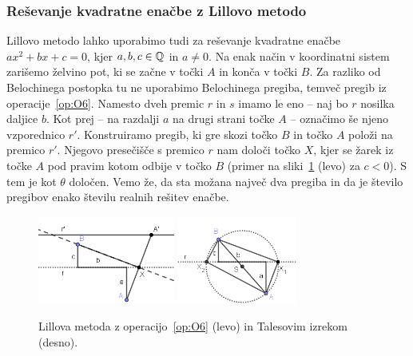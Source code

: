 
\subsubsection{Reševanje kvadratne enačbe z Lillovo metodo}
\label{podpodl:kvadr_en_lill}

Lillovo metodo lahko uporabimo tudi za reševanje kvadratne enačbe $a x^2 + b x + c = 0$, kjer $a, b, c \in \mathbb Q$ in $a \neq 0$. Na enak način v koordinatni sistem zarišemo želvino pot, ki se začne v točki $A$ in konča v točki $B$. Za razliko od Belochinega postopka tu ne uporabimo Belochinega pregiba, temveč pregib iz operacije~\ref{op:O6}. Namesto dveh premic $r$ in $s$ imamo le eno -- naj bo $r$ nosilka daljice $b$. Kot prej -- na razdalji $a$ na drugi strani točke $A$ -- označimo še njeno vzporednico $r'$. Konstruiramo pregib, ki gre skozi točko $B$ in točko $A$ položi na premico $r'$. Njegovo presečišče s premico $r$ nam določi točko $X$, kjer se žarek iz točke $A$ pod pravim kotom odbije v točko $B$ (primer na sliki~\ref{fig:kv_en_lill} (levo) za $c < 0$). S tem je kot $\theta$ določen. Vemo že, da sta možana največ dva pregiba in da je število pregibov enako številu realnih rešitev enačbe.

\begin{figure}[h]
    \centering
    \includegraphics[width=0.4\textwidth]{images/kvadratna_enacba/kvadratna_enacba_lillova_metoda.png}
    \includegraphics[width=0.35\textwidth]{images/kvadratna_enacba/kvadratna_enacba_lillova_metoda_evkl.png}
    \caption[Lillova metoda za kvadratno enačbo]{Lillova metoda z operacijo~\ref{op:O6} (levo) in Talesovim izrekom (desno).}
    \label{fig:kv_en_lill}
\end{figure}

